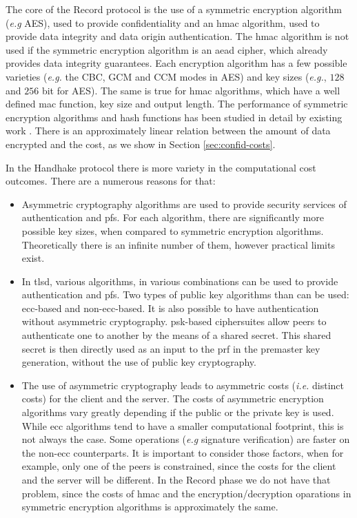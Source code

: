 The core of the Record protocol is the use of a symmetric encryption algorithm (\textit{e.g} AES), used to
provide confidentiality and an \gls{hmac} algorithm, used to provide data integrity and data origin authentication.
The \gls{hmac} algorithm is not used if the symmetric encryption algorithm is an \gls{aead} cipher, which already
provides data integrity guarantees. Each encryption algorithm has a few possible varieties (\textit{e.g.} the CBC, GCM and CCM modes in AES)
and key sizes  (\textit{e.g.}, $128$ and $256$ bit for AES). The same is true for \gls{hmac} algorithms, which
have a well defined \gls{mac} function, key size and output length. The performance of symmetric encryption
algorithms and hash functions has been studied in detail by existing work \cite{nadeem2005performance} \cite{mathew2010performance}.
There is an approximately linear relation between the amount of data encrypted and the cost, as we 
show in Section \ref{sec:confid-costs}.

In the Handhake protocol there is more variety in the computational cost outcomes. There are a numerous reasons for that:

\begin{itemize}

  \item Asymmetric cryptography algorithms are used to provide security services of authentication
  and \gls{pfs}. For each algorithm, there are significantly more possible key sizes, when compared to
  symmetric encryption algorithms. Theoretically there is an infinite number of them, however practical limits exist\cite{lenstra2004key}.

  \item In \gls{tlsd}, various algorithms, in various combinations can be used to provide authentication and \gls{pfs}.
  Two types of public key algorithms than can be used: \gls{ecc}-based and non-\gls{ecc}-based. It is also possible
  to have authentication without asymmetric cryptography. \gls{psk}-based ciphersuites allow peers to
  authenticate one to another by the means of a shared secret. This shared secret is then directly used as an input to the \gls{prf}
  in the premaster key generation, without the use of public key cryptography.

  \item The use of asymmetric cryptography leads to asymmetric costs (\textit{i.e.} distinct costs) for the client and the server. The costs of asymmetric
  encryption algorithms vary greatly depending if the public or the private key is used. While \gls{ecc}
  algorithms tend to have a smaller computational footprint, this is not always the case.
  Some operations (\textit{e.g} signature verification) are faster on the non-\gls{ecc} counterparts.
  It is important to consider those factors, when for example, only one of the peers is constrained, since the costs for the client and the server will be different.
  In the Record phase we do not have that problem, since the costs of \gls{hmac} and the encryption/decryption oparations in
  symmetric encryption algorithms is approximately the same.

\end{itemize}

